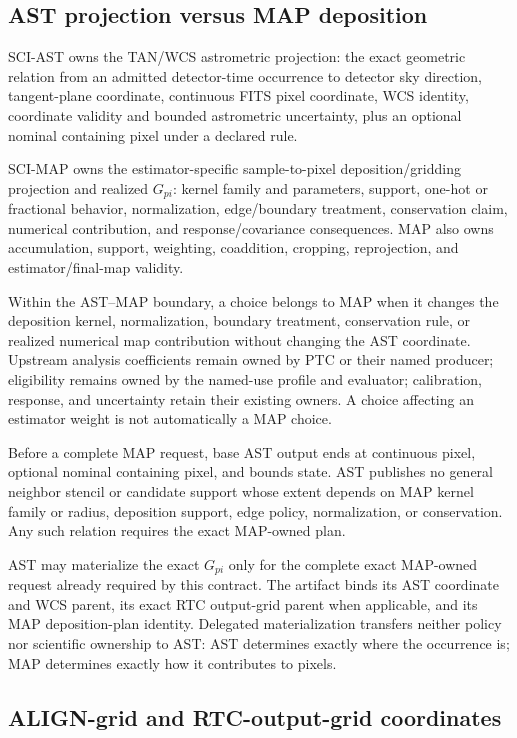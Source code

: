\subsection{AST projection versus MAP deposition}

SCI-AST owns the TAN/WCS astrometric projection: the exact geometric relation
from an admitted detector-time occurrence to detector sky direction,
tangent-plane coordinate, continuous FITS pixel coordinate, WCS identity,
coordinate validity and bounded astrometric uncertainty, plus an optional
nominal containing pixel under a declared rule.

SCI-MAP owns the estimator-specific sample-to-pixel deposition/gridding
projection and realized $G_{pi}$: kernel family and parameters, support,
one-hot or fractional behavior, normalization, edge/boundary treatment,
conservation claim, numerical contribution, and response/covariance
consequences.  MAP also owns accumulation, support, weighting, coaddition,
cropping, reprojection, and estimator/final-map validity.

Within the AST--MAP boundary, a choice belongs to MAP when it changes the
deposition kernel, normalization, boundary treatment, conservation rule, or
realized numerical map contribution without changing the AST coordinate.
Upstream analysis coefficients remain owned by PTC or their named producer;
eligibility remains owned by the named-use profile and evaluator; calibration,
response, and uncertainty retain their existing owners. A choice affecting an
estimator weight is not automatically a MAP choice.

Before a complete MAP request, base AST output ends at continuous pixel,
optional nominal containing pixel, and bounds state. AST publishes no general
neighbor stencil or candidate support whose extent depends on MAP kernel
family or radius, deposition support, edge policy, normalization, or
conservation. Any such relation requires the exact MAP-owned plan.

AST may materialize the exact $G_{pi}$ only for the complete exact MAP-owned
request already required by this contract.  The artifact binds its AST
coordinate and WCS parent, its exact RTC output-grid parent when applicable,
and its MAP deposition-plan identity.  Delegated materialization transfers
neither policy nor scientific ownership to AST: AST determines exactly where
the occurrence is; MAP determines exactly how it contributes to pixels.

\subsection{ALIGN-grid and RTC-output-grid coordinates}

